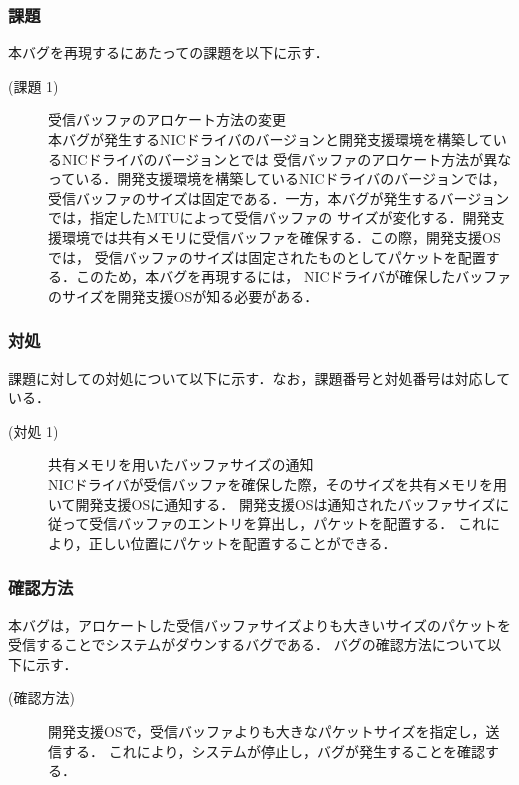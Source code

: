 \documentclass[12pt]{jsarticle}
\begin{document}
\subsubsection{課題}\label{kadai}
本バグを再現するにあたっての課題を以下に示す．
\begin{description}
    \item[(課題 1)] 受信バッファのアロケート方法の変更\\
        本バグが発生するNICドライバのバージョンと開発支援環境を構築しているNICドライバのバージョンとでは
        受信バッファのアロケート方法が異なっている．開発支援環境を構築しているNICドライバのバージョンでは，
        受信バッファのサイズは固定である．一方，本バグが発生するバージョンでは，指定したMTUによって受信バッファの
        サイズが変化する．開発支援環境では共有メモリに受信バッファを確保する．この際，開発支援OSでは，
        受信バッファのサイズは固定されたものとしてパケットを配置する．このため，本バグを再現するには，
        NICドライバが確保したバッファのサイズを開発支援OSが知る必要がある．
\end{description}

\subsubsection{対処}\label{taisyo}
課題に対しての対処について以下に示す．なお，課題番号と対処番号は対応している．
\begin{description}
    \item[(対処 1)] 共有メモリを用いたバッファサイズの通知\\
        NICドライバが受信バッファを確保した際，そのサイズを共有メモリを用いて開発支援OSに通知する．
        開発支援OSは通知されたバッファサイズに従って受信バッファのエントリを算出し，パケットを配置する．
        これにより，正しい位置にパケットを配置することができる．
\end{description}

\subsubsection{確認方法}
本バグは，アロケートした受信バッファサイズよりも大きいサイズのパケットを
受信することでシステムがダウンするバグである．
バグの確認方法について以下に示す．
\begin{description}
    \item[(確認方法)] 開発支援OSで，受信バッファよりも大きなパケットサイズを指定し，送信する．
        これにより，システムが停止し，バグが発生することを確認する．
\end{description}
\end{document}
